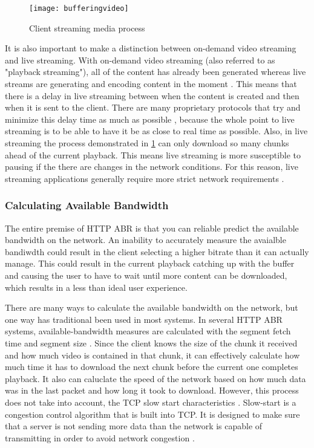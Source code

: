 \documentclass[12pt]{article}
\begin{document}
\begin{figure}[htb]
  \begin{center}
    \texttt{[image: bufferingvideo]}
    \caption{Client streaming media process}
    \label{fig:bufferingvideo}
  \end{center}
\end{figure}

It is also important to make a distinction between on-demand video streaming and live streaming.  With on-demand video streaming (also referred to as "playback streaming"), all of the content has already been generated whereas live streams are generating and encoding content in the moment \cite{Kazantzidis02adaptivemultimedia}.  This means that there is a delay in live streaming between when the content is created and then when it is sent to the client.  There are many proprietary protocols that try and minimize this delay time as much as possible \cite{Tanwir201674}, because the whole point to live streaming is to be able to have it be as close to real time as possible.  Also, in live streaming the process demonstrated in \ref{fig:bufferingvideo} can only download so many chunks ahead of the current playback.  This means live streaming is more susceptible to pausing if the there are changes in the network conditions.  For this reason, live streaming applications generally require more strict network requirements \cite{Kazantzidis02adaptivemultimedia}.

\subsubsection{Calculating Available Bandwidth}
The entire premise of HTTP ABR is that you can reliable predict the available bandwidth on the network.  An inability to accurately measure the avaialble bandiwdth could result in the client selecting a higher bitrate than it can actually manage.  This could result in the current playback catching up with the buffer and causing the user to have to wait until more content can be downloaded, which results in a less than ideal user experience.

There are many ways to calculate the available bandwidth on the network, but one way has traditional been used in most systems. In several HTTP ABR systems, available-bandwidth measures are calculated with the segment fetch time and segment size \cite{7057917}.  Since the client knows the size of the chunk it received and how much video is contained in that chunk, it can effectively calculate how much time it has to download the next chunk before the current one completes playback.  It also can caluclate the speed of the network based on how much data was in the last packet and how long it took to download.  However, this process does not take into account, the TCP slow start characteristics \cite{7057917}.  Slow-start is a congestion control algorithm that is built into TCP.  It is designed to make sure that a server is not sending more data than the network is capable of transmitting in order to avoid network congestion \cite{rfc5681}.
\end{document}
